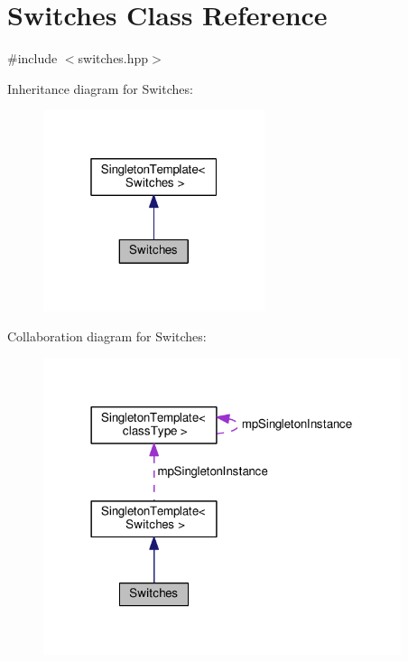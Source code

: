 \hypertarget{classSwitches}{}\section{Switches Class Reference}
\label{classSwitches}


{\ttfamily \#include $<$switches.\+hpp$>$}



Inheritance diagram for Switches\+:\nopagebreak
\begin{figure}[H]
\begin{center}
\leavevmode
\includegraphics[width=184pt]{d0/d2a/classSwitches__inherit__graph}
\end{center}
\end{figure}


Collaboration diagram for Switches\+:\nopagebreak
\begin{figure}[H]
\begin{center}
\leavevmode
\includegraphics[width=297pt]{df/deb/classSwitches__coll__graph}
\end{center}
\end{figure}
